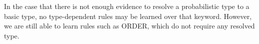 
In the case that there is not enough evidence to resolve a probabilistic type to a basic type, no type-dependent rules may be learned over that keyword.
However, we are still able to learn rules such as {\scriptsize ORDER}, which do not require any resolved type. 




